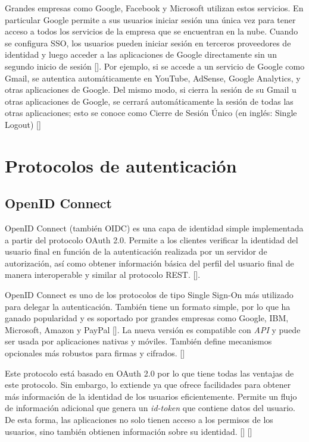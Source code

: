 Grandes empresas como Google, Facebook y Microsoft utilizan estos servicios. En particular Google permite a sus usuarios iniciar sesión una única vez para tener acceso a todos los servicios de la empresa que se encuentran en la nube. Cuando se configura SSO, los usuarios pueden iniciar sesión en terceros proveedores de identidad y luego acceder a las aplicaciones de Google directamente sin un segundo inicio de sesión [\cite{google-support}]. Por ejemplo, si se accede a un servicio de Google como Gmail, se autentica automáticamente en YouTube, AdSense, Google Analytics, y otras aplicaciones de Google. Del mismo modo, si cierra la sesión de su Gmail u otras aplicaciones de Google, se cerrará automáticamente la sesión de todas las otras aplicaciones; esto se conoce como Cierre de Sesión Único (en inglés: Single Logout) [\cite{sso-doc}]

\section{Protocolos de autenticación} \label{protocols}

\subsection{OpenID Connect}
OpenID Connect  (también OIDC) es una capa de identidad simple implementada a partir del protocolo OAuth 2.0. Permite a los clientes verificar la identidad del usuario final en función de la autenticación realizada por un servidor de autorización, así como obtener información básica del perfil del usuario final de manera interoperable y similar al protocolo REST. [\cite{openid-doc}]. 

OpenID Connect es uno de los protocolos de tipo Single Sign-On más utilizado para delegar la autenticación. También tiene un formato simple, por lo que ha ganado popularidad y es soportado por grandes empresas como Google, IBM, Microsoft, Amazon y PayPal [\cite{mainka2017sok}]. La nueva versión es compatible con \textit{API} y puede ser usada por aplicaciones nativas y móviles. También define mecanismos opcionales más robustos para firmas y cifrados. [\cite{openid-doc}]

Este protocolo está basado en OAuth 2.0 por lo que tiene todas las ventajas de este protocolo. Sin embargo, lo extiende ya que ofrece facilidades para obtener más información de la identidad de los usuarios eficientemente. Permite un flujo de información adicional que genera un \textit{id-token} que contiene datos del usuario. De esta forma, las aplicaciones no solo tienen acceso a los permisos de los usuarios, sino también obtienen información sobre su identidad.  [\cite{openid-doc}] [\cite{kutera2016single}]

